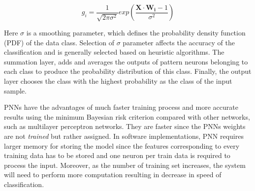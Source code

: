 \begin{equation}
g_{i}=\frac{1}{\sqrt{2\pi\sigma^{2}}}exp\left(\frac{\boldsymbol{X\cdot W_{i}}-1}{\sigma^{2}}\right)
\end{equation}

Here $\sigma$ is a smoothing parameter, which defines the probability density function (PDF) of the data class. 
Selection of $\sigma$ parameter affects the accuracy of the classification and is generally selected based on heuristic algorithms.
The summation layer, adds and averages the outputs of pattern neurons belonging to each class to produce the probability distribution of this class. 
Finally, the output layer chooses the class with the highest probability as the class of the input sample.


PNNs have the advantages of much faster training process and more accurate results using the minimum Bayesian risk criterion compared with other networks, such as multilayer perceptron networks.
They are faster since the PNNs weights are not \emph{trained} but rather assigned.
In software implementations, PNN requires larger memory for storing the model since the features corresponding to every training data has to be stored and one neuron per train data is required to process the input.
Moreover, as the number of training set increases, the system will need to perform more computation resulting in decrease in speed of classification. 



\cite{Zhou2010,Figueiredo1998,Ovtcharov2015,Zhu2010,Shima2007,Bu2004,Zhang2015}